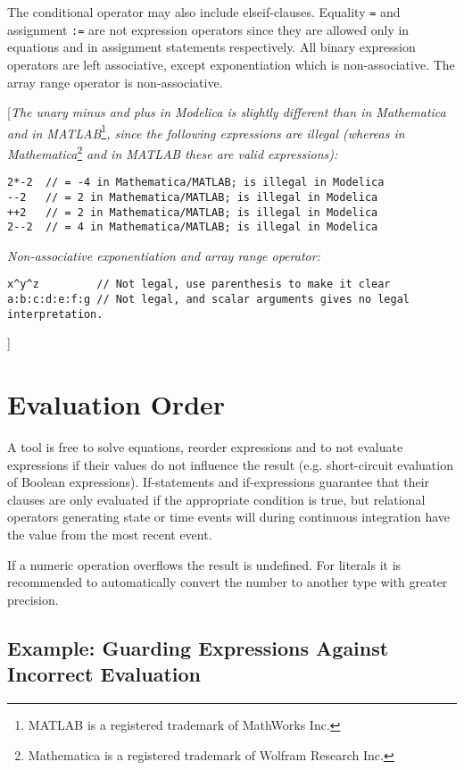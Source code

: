 The conditional operator may also include elseif-clauses. Equality \lstinline!=! and
assignment \lstinline!:=! are not expression operators since they are allowed only
in equations and in assignment statements respectively. All binary
expression operators are left associative, except exponentiation which
is non-associative. The array range operator is non-associative.

{[}\emph{The unary minus and plus in Modelica is slightly different than
in Mathematica and in MATLAB}\footnote{MATLAB is a registered trademark
  of MathWorks Inc.}\emph{, since the following expressions are illegal
(whereas in Mathematica}\footnote{Mathematica is a registered trademark
  of Wolfram Research Inc.} \emph{and in MATLAB these are valid
expressions):}
\begin{lstlisting}[language=modelica]
2*-2  // = -4 in Mathematica/MATLAB; is illegal in Modelica
--2   // = 2 in Mathematica/MATLAB; is illegal in Modelica
++2   // = 2 in Mathematica/MATLAB; is illegal in Modelica
2--2  // = 4 in Mathematica/MATLAB; is illegal in Modelica
\end{lstlisting}

\emph{Non-associative exponentiation and array range operator:}

\begin{lstlisting}[language=modelica]
x^y^z         // Not legal, use parenthesis to make it clear
a:b:c:d:e:f:g // Not legal, and scalar arguments gives no legal interpretation.
\end{lstlisting}
{]}

\section{Evaluation Order}

A tool is free to solve equations, reorder expressions and to not
evaluate expressions if their values do not influence the result (e.g.
short-circuit evaluation of Boolean expressions). If-statements and
if-expressions guarantee that their clauses are only evaluated if the
appropriate condition is true, but relational operators generating state
or time events will during continuous integration have the value from
the most recent event.

If a numeric operation overflows the result is undefined. For literals
it is recommended to automatically convert the number to another type
with greater precision.

\subsection{Example: Guarding Expressions Against Incorrect Evaluation}

